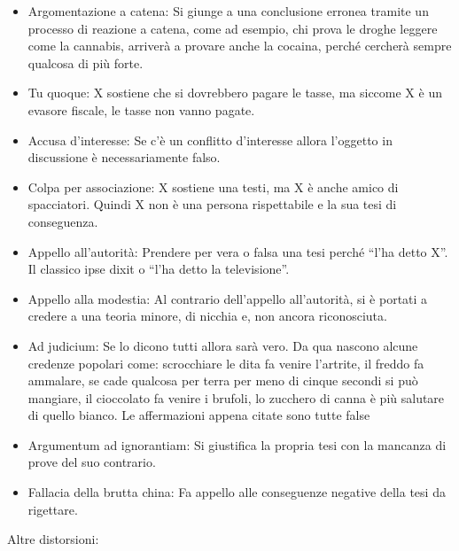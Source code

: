 \documentclass[12pt]{book} %
\begin{document}
\begin{itemize}
\item Argomentazione a catena: Si giunge a una conclusione erronea tramite un processo di reazione a catena, come ad
esempio, chi prova le droghe leggere come la cannabis, arriverà a provare anche la cocaina, perché cercherà sempre
qualcosa di più forte.
\item Tu quoque: X sostiene che si dovrebbero pagare le tasse, ma siccome X è un evasore fiscale, le tasse non vanno
pagate.
\item Accusa d'interesse: Se c'è un conflitto d'interesse allora
l'oggetto in discussione è necessariamente falso.
\item Colpa per associazione: X sostiene una testi, ma X è anche amico di spacciatori. Quindi X non è una persona
rispettabile e la sua tesi di conseguenza.
\item Appello all'autorità: Prendere per vera o falsa una tesi perché “l'ha detto X”. Il classico
ipse dixit o “l'ha detto la televisione”.
\item Appello alla modestia: Al contrario dell'appello all'autorità, si è portati a credere a una teoria minore, di
nicchia e, non ancora riconosciuta.
\item Ad judicium: Se lo dicono tutti allora sarà vero. Da qua nascono alcune credenze popolari come: scrocchiare le dita fa venire l'artrite, il freddo fa ammalare, se cade qualcosa per terra per meno di cinque secondi si può mangiare, il cioccolato
fa venire i brufoli, lo zucchero di canna è più salutare di quello bianco. Le affermazioni appena citate sono tutte
false
\item Argumentum ad ignorantiam: Si giustifica la propria tesi con la mancanza di prove del suo contrario.
\item Fallacia della brutta china: Fa appello alle conseguenze negative della tesi da rigettare.
\end{itemize}

Altre distorsioni:
\end{document}
